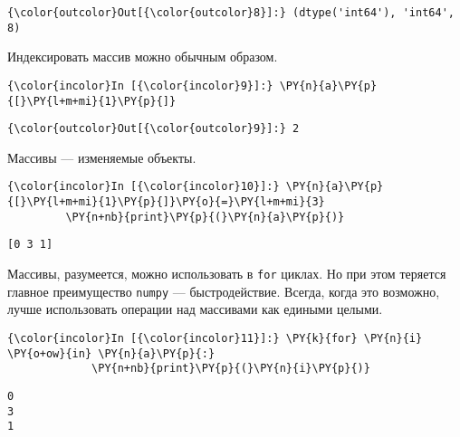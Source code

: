             \begin{Verbatim}[commandchars=\\\{\}]
{\color{outcolor}Out[{\color{outcolor}8}]:} (dtype('int64'), 'int64', 8)
\end{Verbatim}
        
    Индексировать массив можно обычным образом.

    \begin{Verbatim}[commandchars=\\\{\}]
{\color{incolor}In [{\color{incolor}9}]:} \PY{n}{a}\PY{p}{[}\PY{l+m+mi}{1}\PY{p}{]}
\end{Verbatim}

            \begin{Verbatim}[commandchars=\\\{\}]
{\color{outcolor}Out[{\color{outcolor}9}]:} 2
\end{Verbatim}
        
    Массивы --- изменяемые объекты.

    \begin{Verbatim}[commandchars=\\\{\}]
{\color{incolor}In [{\color{incolor}10}]:} \PY{n}{a}\PY{p}{[}\PY{l+m+mi}{1}\PY{p}{]}\PY{o}{=}\PY{l+m+mi}{3}
         \PY{n+nb}{print}\PY{p}{(}\PY{n}{a}\PY{p}{)}
\end{Verbatim}

    \begin{Verbatim}[commandchars=\\\{\}]
[0 3 1]

    \end{Verbatim}

    Массивы, разумеется, можно использовать в \texttt{for} циклах. Но при
этом теряется главное преимущество \texttt{numpy} --- быстродействие.
Всегда, когда это возможно, лучше использовать операции над массивами
как едиными целыми.

    \begin{Verbatim}[commandchars=\\\{\}]
{\color{incolor}In [{\color{incolor}11}]:} \PY{k}{for} \PY{n}{i} \PY{o+ow}{in} \PY{n}{a}\PY{p}{:}
             \PY{n+nb}{print}\PY{p}{(}\PY{n}{i}\PY{p}{)}
\end{Verbatim}

    \begin{Verbatim}[commandchars=\\\{\}]
0
3
1

    \end{Verbatim}

